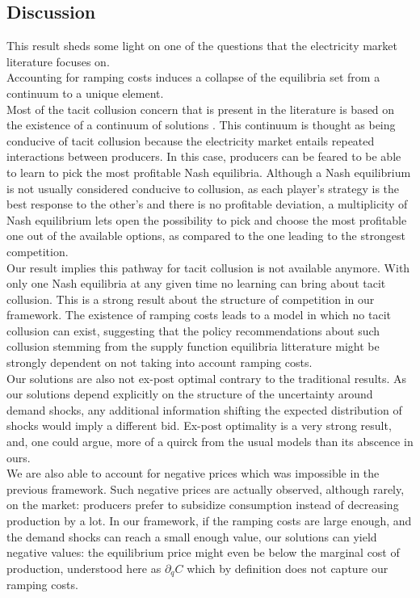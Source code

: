 \subsection{Discussion}\label{discussion_oligo}

This result sheds some light on one of the questions that the electricity market literature focuses on. \\

Accounting for ramping costs induces a collapse of the equilibria set from a continuum to a unique element. \\

Most of the tacit collusion concern that is present in the literature is based on the existence of a continuum of solutions \cite{bolle1992supply}. This continuum is thought as being conducive of tacit collusion because the electricity market entails repeated interactions between producers. In this case, producers can be feared to be able to learn to pick the most profitable Nash equilibria. Although a Nash equilibrium is not usually considered conducive to collusion, as each player's strategy is the best response to the other's and there is no profitable deviation, a multiplicity of Nash equilibrium lets open the possibility to pick and choose the most profitable one out of the available options, as compared to the one leading to the strongest competition.\\

Our result implies this pathway for tacit collusion is not available anymore. With only one Nash equilibria at any given time no learning can bring about tacit collusion. This is a strong result about the structure of competition in our framework. The existence of ramping costs leads to a model in which no tacit collusion can exist, suggesting that the policy recommendations about such collusion stemming from the supply function equilibria litterature might be strongly dependent on not taking into account ramping costs.\\

Our solutions are also not ex-post optimal contrary to the traditional results. As our solutions depend explicitly on the structure of the uncertainty around demand shocks, any additional information shifting the expected distribution of shocks would imply a different bid. Ex-post optimality is a very strong result, and, one could argue, more of a quirck from the usual models than its abscence in ours.\\

We are also able to account for negative prices which was impossible in the previous framework. Such negative prices are actually observed, although rarely, on the market: producers prefer to subsidize consumption instead of decreasing production by a lot. In our framework, if the ramping costs are large enough, and the demand shocks can reach a small enough value, our solutions can yield negative values: the equilibrium price might even be below the marginal cost of production, understood here as $\partial_q C$ which by definition does not capture our ramping costs.\\

